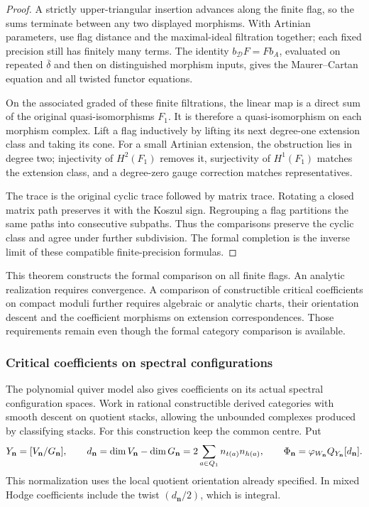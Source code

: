 \begin{proof}
A strictly upper-triangular insertion advances along the finite
flag, so the sums terminate between any two displayed morphisms.
With Artinian parameters, use flag distance and the maximal-ideal
filtration together; each fixed precision still has finitely many
terms. The identity $b_{\mathcal D}F=Fb_A$, evaluated on repeated
$\overline\delta$ and then on distinguished morphism inputs, gives the
Maurer--Cartan equation and all twisted functor equations.

On the associated graded of these finite filtrations, the linear
map is a direct sum of the original quasi-isomorphisms $F_1$.
It is therefore a quasi-isomorphism on each morphism complex.
Lift a flag inductively by lifting its next degree-one extension
class and taking its cone. For a small Artinian extension, the
obstruction lies in degree two; injectivity of $H^2(F_1)$ removes
it, surjectivity of $H^1(F_1)$ matches the extension class, and a
degree-zero gauge correction matches representatives.

The trace is the original cyclic trace followed by matrix trace.
Rotating a closed matrix path preserves it with the Koszul sign.
Regrouping a flag partitions the same paths into consecutive
subpaths. Thus the comparisons preserve the cyclic class and agree
under further subdivision. The formal completion is the inverse
limit of these compatible finite-precision formulas.
\end{proof}

This theorem constructs the formal comparison on all finite flags.
An analytic realization requires convergence. A comparison of
constructible critical coefficients on compact moduli further
requires algebraic or analytic charts, their orientation descent and
the coefficient morphisms on extension correspondences. Those
requirements remain even though the formal category comparison is
available.

\subsubsection*{Critical coefficients on spectral configurations}

The polynomial quiver model also gives coefficients on its actual
spectral configuration spaces. Work in rational constructible
derived categories with smooth descent on quotient stacks, allowing
the unbounded complexes produced by classifying stacks. For this
construction keep the common centre. Put
\[
 Y_{\mathbf n}=[V_{\mathbf n}/G_{\mathbf n}],
 \qquad d_{\mathbf n}=\dim V_{\mathbf n}-\dim G_{\mathbf n}
       =2\sum_{a\in Q_1}n_{t(a)}n_{h(a)},
 \qquad
 \Phi_{\mathbf n}=\varphi_{W_{\mathbf n}}
                         Q_{Y_{\mathbf n}}[d_{\mathbf n}].
\]
This normalization uses the local quotient orientation already
specified. In mixed Hodge coefficients include the twist
$(d_{\mathbf n}/2)$, which is integral.


